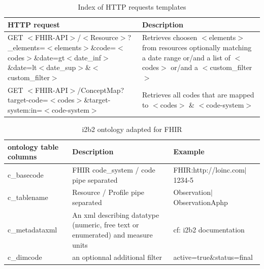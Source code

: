 \documentclass{amia}
\begin{document}
\begin{table}[h]
\centering
	\begin{tabular}{|p{6cm}|p{10cm}|}
  \hline
    \textbf{HTTP request}    & \textbf{Description}  \\ \hline
		GET $<$FHIR-API$>$/$<$Resource$>$\newline?\_elements=$<$elements$>$\&code=$<$codes$>$\newline\&date=gt$<$date\_inf$>$\&date=lt$<$date\_sup$>$\newline\&$<$custom\_filter$>$  & Retrieves choosen $<$elements$>$ from resources optionally matching a date range or/and a list of $<$codes$>$  or/and a $<$custom\_filter$>$     \\ \hline
	 GET $<$FHIR-API$>$/ConceptMap\newline?target-code=$<$codes$>$\newline\&target-system:in=$<$code-system$>$  & Retrieves all codes that are mapped to $<$codes$>$ \& $<$code-system$>$   \\ \hline
  \end{tabular}
\caption{Index of HTTP requests templates}
	\label{tab2}
\end{table}

\begin{table}[h]
\centering
	\begin{tabular}{|p{2cm}|p{6cm}|p{5cm}|}
  \hline
		\textbf{ontology table columns}    & \textbf{Description} & \textbf{Example} \\ \hline
		c\_basecode  &  FHIR code\_system / code pipe separated  & FHIR:http://loinc.com$|$1234-5  \\ \hline
		c\_tablename &  Resource / Profile pipe separated  & Observation$|$ObservationAphp  \\ \hline
		c\_metadataxml  &  An xml describing datatype (numeric, free text or enumerated) and measure units  & cf: i2b2 documentation   \\ \hline
		c\_dimcode &  an optionnal additional filter  & active=true\&status=final  \\ \hline
  \end{tabular}
\caption{i2b2 ontology adapted for FHIR}
	\label{tab1}
\end{table}
\end{document}
